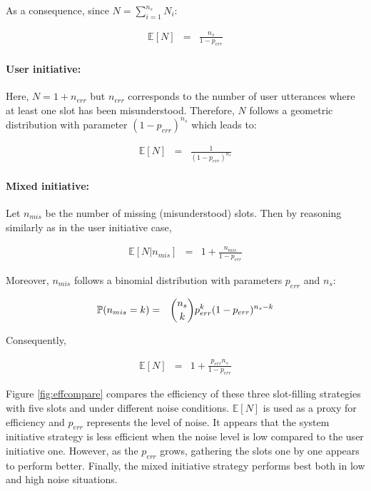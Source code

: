                      As a consequence, since $N = \sum_{i=1}^{n_s} N_i$:

                     \begin{eqnarray}
                       \mathbb{E} [N] & = & \frac{n_s}{1-p_{err}}
                     \end{eqnarray}

                \paragraph{User initiative:} Here, $N = 1 + n_{err}$  but $n_{err}$ corresponds to the number of user utterances where at least one slot has been misunderstood. Therefore, $N$ follows a geometric distribution with parameter $(1-p_{err})^{n_s}$ which leads to:

                     \begin{eqnarray}
                       \mathbb{E} [N] & = & \frac{1}{(1-p_{err})^{n_s}}
                     \end{eqnarray}

                \paragraph{Mixed initiative:} Let $n_{mis}$ be the number of missing (misunderstood) slots. Then by reasoning similarly as in the user initiative case,
								
											\begin{eqnarray}
												\mathbb{E} [N | n_{mis}] & = & 1 + \frac{n_{mis}}{1-p_{err}}
											\end{eqnarray}

                     Moreover, $n_{mis}$ follows a binomial distribution with parameters $p_{err}$ and $n_s$:
										
											\begin{eqnarray}
												\mathbb{P} (n_{mis} = k) & = & \dbinom{n_s}{k} p_{err}^k (1-p_{err})^{n_s-k}
											\end{eqnarray}
										
										Consequently,

                     \begin{eqnarray}
                       \mathbb{E} [N] & = & 1 + \frac{p_{err} n_s}{1-p_{err}}
                     \end{eqnarray}
										
								Figure \ref{fig:effcompare} compares the efficiency of these three slot-filling strategies with five slots and under different noise conditions. $\mathbb{E} [N]$ is used as a proxy for efficiency and $p_{err}$ represents the level of noise. It appears that the system initiative strategy is less efficient when the noise level is low compared to the user initiative one. However, as the $p_{err}$ grows, gathering the slots one by one appears to perform better. Finally, the mixed initiative strategy performs best both in low and high noise situations.
								
